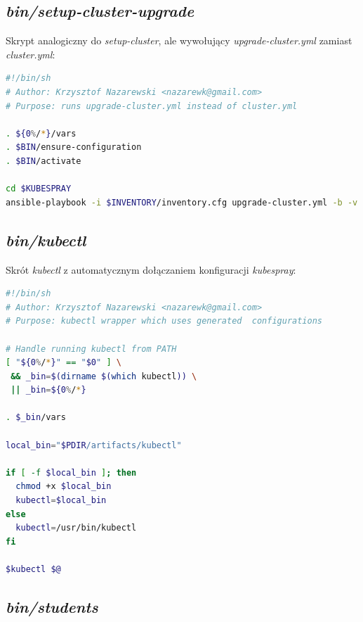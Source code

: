 \documentclass[a4paper,12pt,twoside,openany]{report}
\begin{document}
\newpage

\hypertarget{binsetup-cluster-upgrade}{%
\subsection{\texorpdfstring{\emph{bin/setup-cluster-upgrade}}{bin/setup-cluster-upgrade}}\label{binsetup-cluster-upgrade}}

Skrypt analogiczny do \emph{setup-cluster}, ale wywołujący
\emph{upgrade-cluster.yml} zamiast \emph{cluster.yml}:

\begin{lstlisting}[language=bash]
#!/bin/sh
# Author: Krzysztof Nazarewski <nazarewk@gmail.com>
# Purpose: runs upgrade-cluster.yml instead of cluster.yml

. ${0%/*}/vars
. $BIN/ensure-configuration
. $BIN/activate

cd $KUBESPRAY
ansible-playbook -i $INVENTORY/inventory.cfg upgrade-cluster.yml -b -v $@
\end{lstlisting}

\hypertarget{binkubectl}{%
\subsection{\texorpdfstring{\emph{bin/kubectl}}{bin/kubectl}}\label{binkubectl}}

Skrót \emph{kubectl} z automatycznym dołączaniem konfiguracji
\emph{kubespray}:

\begin{lstlisting}[language=bash]
#!/bin/sh
# Author: Krzysztof Nazarewski <nazarewk@gmail.com>
# Purpose: kubectl wrapper which uses generated  configurations

# Handle running kubectl from PATH
[ "${0%/*}" == "$0" ] \
 && _bin=$(dirname $(which kubectl)) \
 || _bin=${0%/*}

. $_bin/vars

local_bin="$PDIR/artifacts/kubectl"

if [ -f $local_bin ]; then
  chmod +x $local_bin
  kubectl=$local_bin
else
  kubectl=/usr/bin/kubectl
fi

$kubectl $@
\end{lstlisting}

\newpage

\hypertarget{binstudents}{%
\subsection{\texorpdfstring{\emph{bin/students}}{bin/students}}\label{binstudents}}
\end{document}
